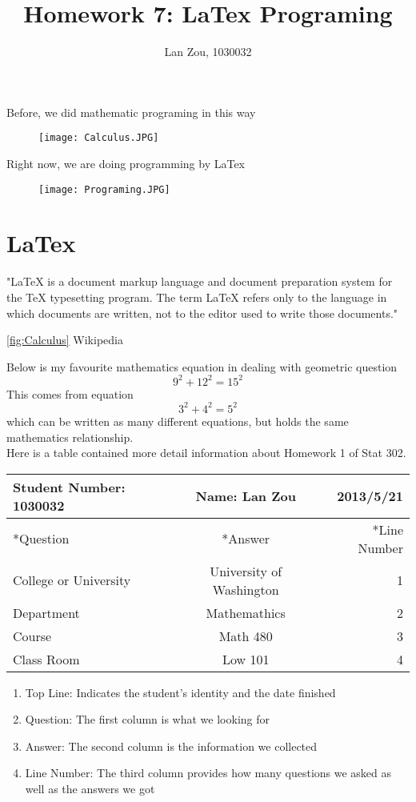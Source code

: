 \documentclass[11pt]{article}
\begin{document}
\title {Homework 7: LaTex Programing}
\author{Lan Zou, 1030032}
\maketitle


Before, we did mathematic programing in this way
\begin{figure}[h]
 \begin{center}
  \texttt{[image: Calculus.JPG]}
 \end{center}
\end{figure}

Right now, we are doing programming by LaTex
\begin{figure}[h]
 \begin{center}
  \texttt{[image: Programing.JPG]}
 \end{center}
\end{figure}

\section{LaTex}
"LaTeX is a document markup language and document preparation system for the TeX typesetting program. The term LaTeX refers only to the language in which documents are written, not to the editor used to write those documents." 

\label{fig:Calculus}
\ref{fig:Calculus}
Wikipedia

\newpage
Below is my favourite mathematics equation
in dealing with
geometric question
\[
9^2 + 12^2 = 15^2
\]
This comes from equation
\[
3^2 + 4^2 = 5^2
\]which can be written as many different equations, but holds the same mathematics relationship. 
\[
\]
Here is a table contained more detail information about Homework 1 of Stat 302.
\begin{center}
 \begin{tabular}{| l | c | r |}
  \hline
    Student Number: 1030032 & Name: Lan Zou & 2013/5/21 \\ \hline
    \hline
    *Question & *Answer & *Line Number \\ \hline
   College or University & University of Washington & 1 \\ \hline
 	Department & Mathemathics & 2\\ \hline
 	Course & Math 480 & 3\\ \hline
 	Class Room & Low 101 & 4 \\ \hline
  \hline
 \end{tabular}

\end{center}

\begin{enumerate}
\item Top Line: Indicates the student's identity and the date finished 
\item Question: The first column is what we looking for
\item Answer: The second column is the information we collected
\item Line Number: The third column provides how many questions we asked as well as the answers we got 
\end{enumerate}
\end{document}
